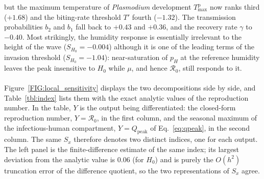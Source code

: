 \documentclass[a4paper,fleqn]{cas-dc}
\begin{document}
but the maximum temperature of \textit{Plasmodium} development
$T_{\max}^{\mathrm{p}}$ now ranks third ($+1.68$) and the biting-rate
threshold $T'$ fourth ($-1.32$). The transmission probabilities $b_2$
and $b_1$ fall back to $+0.43$ and $+0.36$, and the recovery rate
$\gamma$ to $-0.40$. Most strikingly, the humidity response is
essentially irrelevant to the height of the wave ($S_{H_0} = -0.004$)
although it is one of the leading terms of the invasion threshold
($S_{H_0} = -1.04$): near-saturation of $p_H$ at the reference
humidity leaves the peak insensitive to $H_0$ while $\mu$, and hence
$\mathcal{R}_0$, still responds to it.
\\\\
Figure~\ref{FIG:local_sensitivity} displays the two decompositions side by
side, and Table~\ref{tbl:index} lists them with the exact analytic values of
the reproduction number. In the table, $Y$ is the output being
differentiated: the closed-form reproduction number, $Y = \mathcal{R}_0$,
in the first column, and the seasonal maximum of the
infectious-human compartment, $Y = Q_{\mathrm{peak}}$ of
Eq.~\eqref{eq:qpeak}, in the second column. The same $S_x$ therefore denotes two distinct indices, one for each output. The
left panel is the finite-difference estimate
of the same index; its largest deviation from the analytic value is
$0.06$ (for $H_0$) and is purely the $O(h^2)$ truncation error of the
difference quotient, so the two representations of $S_x$ agree.
\end{document}

